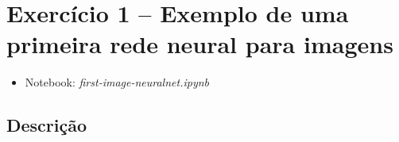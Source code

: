 \section{Exercício 1 -- Exemplo de uma primeira rede neural para imagens}

\begin{itemize}
	\item Notebook: \textit{first-image-neuralnet.ipynb}
\end{itemize}

\subsection{Descrição}